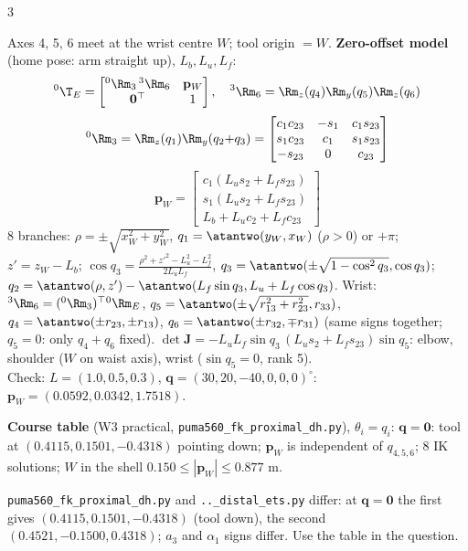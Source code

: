 \begin{multicols}{3}
\begin{fbx}
Axes 4, 5, 6 meet at the wrist centre $W$; tool origin $=W$. \textbf{Zero-offset model} (home pose: arm straight up), $L_b,L_u,L_f$:
{\rbsm\[{}^0\T_E=\begin{bmatrix}{}^0\Rm_3\,{}^3\Rm_6&\mathbf p_W\\\rbcol&1\end{bmatrix},\quad{}^3\Rm_6=\Rm_z(q_4)\Rm_y(q_5)\Rm_z(q_6)\]}
{\rbsm\[{}^0\Rm_3=\Rm_z(q_1)\Rm_y(q_2{+}q_3)=\begin{bmatrix}c_1c_{23}&-s_1&c_1s_{23}\\s_1c_{23}&c_1&s_1s_{23}\\-s_{23}&0&c_{23}\end{bmatrix}\]}
{\rbsm\[\mathbf p_W=\begin{bmatrix}c_1(L_us_2+L_fs_{23})\\s_1(L_us_2+L_fs_{23})\\L_b+L_uc_2+L_fc_{23}\end{bmatrix}\]}
8 branches: $\rho=\pm\sqrt{x_W^2+y_W^2}$, $q_1=\atantwo(y_W,x_W)$ ($\rho>0$) or $+\pi$; $z'=z_W-L_b$; $\cos q_3=\frac{\rho^2+z'^2-L_u^2-L_f^2}{2L_uL_f}$, $q_3=\atantwo(\pm\sqrt{1-\cos^2q_3},\cos q_3)$; $q_2=\atantwo(\rho,z')-\atantwo(L_f\sin q_3,L_u+L_f\cos q_3)$. Wrist: ${}^3\Rm_6=({}^0\Rm_3)^\top{}^0\Rm_E$, $q_5=\atantwo(\pm\sqrt{r_{13}^2+r_{23}^2},r_{33})$, $q_4=\atantwo(\pm r_{23},\pm r_{13})$, $q_6=\atantwo(\pm r_{32},\mp r_{31})$ (same signs together; $q_5=0$: only $q_4{+}q_6$ fixed).
$\det\mathbf J=-L_uL_f\sin q_3\,(L_us_2+L_fs_{23})\sin q_5$: elbow, shoulder ($W$ on waist axis), wrist ($\sin q_5=0$, rank 5).\\
Check: $L=(1.0,0.5,0.3)$, $\mathbf q=(30,20,-40,0,0,0)^\circ$: $\mathbf p_W=(0.0592,0.0342,1.7518)$. \chk
\par\medskip
\textbf{Course table} (W3 practical, \texttt{puma560\_fk\_proximal\_dh.py}), $\theta_i=q_i$:
$\mathbf q=\mathbf 0$: tool at $(0.4115,0.1501,-0.4318)$ pointing down; $\mathbf p_W$ is independent of $q_{4,5,6}$; 8 IK solutions; $W$ in the shell $0.150\le|\mathbf p_W|\le0.877$ m. \chk
\end{fbx}
\begin{slideerr}
\texttt{puma560\_fk\_proximal\_dh.py} and \texttt{..\_distal\_ets.py} differ: at $\mathbf q=\mathbf 0$ the first gives $(0.4115,0.1501,-0.4318)$ (tool down), the second $(0.4521,-0.1500,0.4318)$; $a_3$ and $\alpha_1$ signs differ. Use the table in the question.
\end{slideerr}


\end{multicols}
